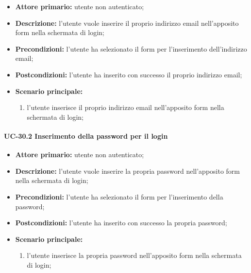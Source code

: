 	\begin{itemize}
		\item \textbf{Attore primario:} utente non autenticato;

		\item \textbf{Descrizione:} l'utente vuole inserire il proprio indirizzo email nell'apposito form nella schermata di login;

		\item \textbf{Precondizioni:} l'utente ha selezionato il form per l'inserimento dell'indirizzo email;

		\item \textbf{Postcondizioni:} l'utente ha inserito con successo il proprio indirizzo email;

		\item \textbf{Scenario principale:}
	  		\begin{enumerate}
		  		\item l'utente inserisce il proprio indirizzo email nell'apposito form nella schermata di login; 
	  		\end{enumerate}
	\end{itemize}

\paragraph{UC-30.2 Inserimento della password per il login}

	\begin{itemize}
		\item \textbf{Attore primario:} utente non autenticato;

		\item \textbf{Descrizione:} l'utente vuole inserire la propria password nell'apposito form nella schermata di login;

		\item \textbf{Precondizioni:} l'utente ha selezionato il form per l'inserimento della password;

		\item \textbf{Postcondizioni:} l'utente ha inserito con successo la propria password;

		\item \textbf{Scenario principale:}
	  		\begin{enumerate}
			  \item l'utente inserisce la propria password nell'apposito form nella schermata di login; 
	  		\end{enumerate}
	\end{itemize}

